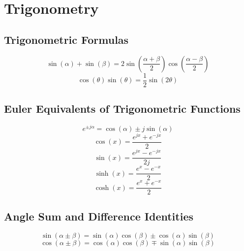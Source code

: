 \section{Trigonometry} \label{app:Trig}
	\subsection{Trigonometric Formulas} \label{subsec:Trig Formulas}
		\begin{equation} \label{eq:Sin plus Sin with diff Angles}
			\sin \left( \alpha \right) + \sin \left( \beta \right) = 2 \sin \left( \frac{\alpha + \beta}{2} \right) \cos\left( \frac{\alpha - \beta}{2} \right)  
		\end{equation}
		\begin{equation} \label{eq:Cosine-Sine Product}
			\cos \left( \theta \right) \sin \left( \theta \right) = \frac{1}{2} \sin \left( 2 \theta \right)
		\end{equation}
	
	\subsection{Euler Equivalents of Trigonometric Functions} \label{subsec:Euler Equivalents}
		\begin{equation} \label{eq:Euler Complex}
			e^{\pm j \alpha} = \cos \left( \alpha \right) \pm j \sin \left( \alpha \right)
		\end{equation}
		\begin{equation} \label{eq:Euler Sin}
			\cos \left( x \right) = \frac{e^{j x} + e^{-j x}}{2}
		\end{equation}
		\begin{equation} \label{eq:Euler Cos}
			\sin \left( x \right) = \frac{e^{j x} - e^{-j x}}{2 j}
		\end{equation}
		\begin{equation} \label{eq:Euler Sinh}
			\sinh \left( x \right) = \frac{e^{x} - e^{-x}}{2}
		\end{equation}
		\begin{equation} \label{eq:Euler Cosh}
			\cosh \left( x \right) = \frac{e^{x} + e^{-x}}{2}
		\end{equation}
	
	\subsection{Angle Sum and Difference Identities} \label{subsec:Angle Sum and Difference Identities}
		\begin{equation} \label{eq:Sin Angle Sum and Difference}
			\sin \left( \alpha \pm \beta \right) = \sin \left( \alpha \right) \cos \left( \beta \right) \pm \cos \left( \alpha \right) \sin \left( \beta \right)
		\end{equation}
		\begin{equation} \label{eq:Cos Angle Sum and Difference}
			\cos \left( \alpha \pm \beta \right) = \cos \left( \alpha \right) \cos \left( \beta \right) \mp \sin \left( \alpha \right) \sin \left( \beta \right)
		\end{equation}
	
